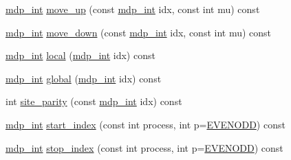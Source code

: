 \begin{DoxyCompactItemize}
\hyperlink{mdp__global__vars_8h_aaa1ad9d0dcd2124aa5af0120d9954174}{mdp\_\-int} \hyperlink{classmdp__lattice_a496a60d5988294a9d0da7b635005d410}{move\_\-up} (const \hyperlink{mdp__global__vars_8h_aaa1ad9d0dcd2124aa5af0120d9954174}{mdp\_\-int} idx, const int mu) const 
\item 
\hyperlink{mdp__global__vars_8h_aaa1ad9d0dcd2124aa5af0120d9954174}{mdp\_\-int} \hyperlink{classmdp__lattice_a9304b6cc18f178e2fcec73c3b8b9d76d}{move\_\-down} (const \hyperlink{mdp__global__vars_8h_aaa1ad9d0dcd2124aa5af0120d9954174}{mdp\_\-int} idx, const int mu) const 
\item 
\hyperlink{mdp__global__vars_8h_aaa1ad9d0dcd2124aa5af0120d9954174}{mdp\_\-int} \hyperlink{classmdp__lattice_a9b2c219bd0fb16482508b87839d02e9b}{local} (\hyperlink{mdp__global__vars_8h_aaa1ad9d0dcd2124aa5af0120d9954174}{mdp\_\-int} idx) const 
\item 
\hyperlink{mdp__global__vars_8h_aaa1ad9d0dcd2124aa5af0120d9954174}{mdp\_\-int} \hyperlink{classmdp__lattice_a1d7f81c235e6f0259013399f01f98306}{global} (\hyperlink{mdp__global__vars_8h_aaa1ad9d0dcd2124aa5af0120d9954174}{mdp\_\-int} idx) const 
\item 
int \hyperlink{classmdp__lattice_af8e8ea7660136dc3810b0a14a41b6505}{site\_\-parity} (const \hyperlink{mdp__global__vars_8h_aaa1ad9d0dcd2124aa5af0120d9954174}{mdp\_\-int} idx) const 
\item 
\hyperlink{mdp__global__vars_8h_aaa1ad9d0dcd2124aa5af0120d9954174}{mdp\_\-int} \hyperlink{classmdp__lattice_a9cc8de7512a9ff465f22e4ddaf307e38}{start\_\-index} (const int process, int p=\hyperlink{mdp__global__vars_8h_a4c9de81f2de5a74b588107b6c0afb9ee}{EVENODD}) const 
\item 
\hyperlink{mdp__global__vars_8h_aaa1ad9d0dcd2124aa5af0120d9954174}{mdp\_\-int} \hyperlink{classmdp__lattice_ada0f943b50d6aeb302e4fc6cf2fcabb9}{stop\_\-index} (const int process, int p=\hyperlink{mdp__global__vars_8h_a4c9de81f2de5a74b588107b6c0afb9ee}{EVENODD}) const 
\end{DoxyCompactItemize}

